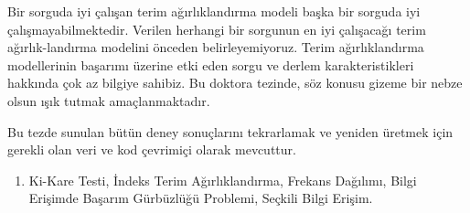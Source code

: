 \begin{spacing}{1.1}
Bir sorguda iyi \c{c}al{\i}\c{s}an terim a\u{g}{\i}rl{\i}kland{\i}rma modeli ba\c{s}ka bir sorguda iyi \c{c}al{\i}\c{s}mayabilmektedir. 
Verilen herhangi bir sorgunun en iyi \c{c}al{\i}\c{s}aca\u{g}{\i} terim a\u{g}{\i}rl{\i}k-land{\i}rma modelini \"{o}nceden belirleyemiyoruz. 
Terim a\u{g}{\i}rl{\i}kland{\i}rma modellerinin ba\c{s}ar{\i}m{\i} \"{u}zerine etki eden sorgu ve derlem karakteristikleri hakk{\i}nda \c{c}ok az bilgiye sahibiz. 
Bu doktora tezinde, s\"{o}z konusu gizeme bir nebze olsun {\i}\c{s}{\i}k tutmak ama\c{c}lanmaktad{\i}r.

Bu tezde sunulan b\"{u}t\"{u}n deney sonu\c{c}lar{\i}n{\i} tekrarlamak ve yeniden \"{u}retmek i\c{c}in gerekli olan veri ve kod \c{c}evrimi\c{c}i olarak mevcuttur.\

\setlength\leftmargini{4.0cm}
\begin{enumerate}[label=\textbf{Anahtar S\"{o}zc\"{u}kler:}]
  \item Ki-Kare Testi, \.{I}ndeks Terim A\u{g}{\i}rl{\i}kland{\i}rma, Frekans Da\u{g}{\i}l{\i}m{\i}, Bilgi Eri\c{s}imde Ba\c{s}ar{\i}m G\"{u}rb\"{u}zl\"{u}\u{g}\"{u} Problemi, Se\c{c}kili Bilgi Eri\c{s}im.
\end{enumerate}

\end{spacing}
